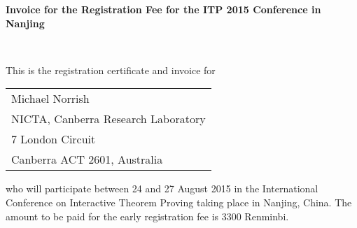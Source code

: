 \documentclass[12pt]{letter}
\begin{document}
\begin{letter}
{\bf Invoice for the Registration Fee for the ITP 2015 
Conference in Nanjing}

\opening{\mbox{}\\[-12mm]}

This is the registration certificate and invoice for 

\begin{center}
\begin{tabular}{l}
Michael Norrish\\
NICTA, Canberra Research Laboratory\\
7 London Circuit\\ 
Canberra ACT 2601, Australia
\end{tabular}
\end{center}

who will participate between 
24 and 27 August 2015 in the International Conference on Interactive Theorem Proving
taking place in Nanjing, China. The amount to be 
paid for the early registration 
fee is 
3300 Renminbi.\medskip


\end{letter}
\end{document}
